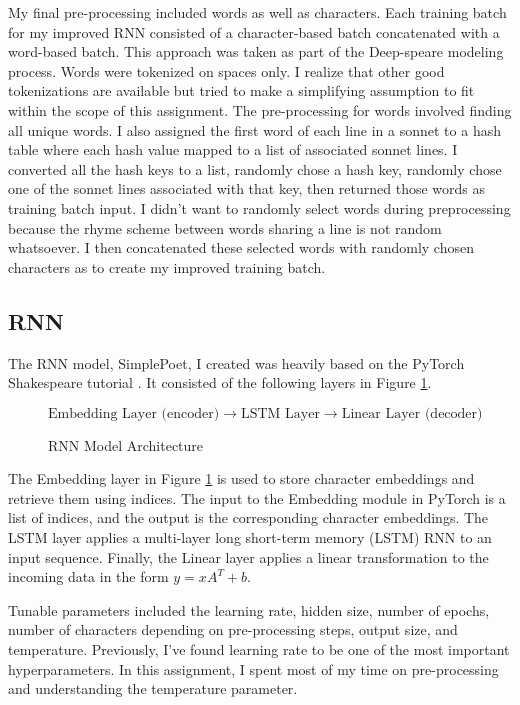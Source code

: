 \documentclass[a4paper,12pt]{article} %
\begin{document}
My final pre-processing included words as well as characters. Each training
batch for my improved RNN consisted of a character-based batch concatenated
with a word-based batch. This approach was taken as part of the Deep-speare
\cite{lau2018deepspeare} modeling process. Words were tokenized on spaces
only. I realize that other good tokenizations are available but tried to make
a simplifying assumption to fit within the scope of this assignment. The
pre-processing for words involved finding all unique words. I also  assigned
the first word of each line in a sonnet to a hash table where each hash
value mapped to a list of associated sonnet lines. I converted all the hash
keys to a list, randomly chose a hash key, randomly chose one of the sonnet
lines associated with that key, then returned those words as training batch
input. I didn't want to randomly select words during preprocessing because the
rhyme scheme between words sharing a line is not random whatsoever. I then
concatenated these selected words with randomly chosen characters as to
create my improved training batch.

\subsection{RNN}

The RNN model, SimplePoet, I created was heavily based on the PyTorch
Shakespeare tutorial \cite{practica59:online}. It consisted of the following
layers in Figure \ref{fig:rnn}. \newline

\begin{figure}
\[
\boxed{\text{Embedding Layer (encoder)}} \rightarrow
\boxed{\text{LSTM Layer}} \rightarrow
\boxed{\text{Linear Layer (decoder)}}
\]
\caption{RNN Model Architecture}
\label{fig:rnn}
\end{figure}

The Embedding layer in Figure \ref{fig:rnn} is used to store character
embeddings and retrieve them
using indices. The input to the Embedding module in PyTorch is a list of
indices, and the output is the corresponding character embeddings. The LSTM
layer applies a multi-layer long short-term memory (LSTM) RNN to an input
sequence. Finally, the Linear layer applies a linear transformation to the
incoming data in the form $y = xA^T + b$. \newline

Tunable parameters included the learning rate, hidden size, number of
epochs, number of characters depending on pre-processing steps, output
size, and temperature. Previously, I've found learning rate to be one of
the most important hyperparameters. In this assignment, I spent most of
my time on pre-processing and understanding the temperature parameter.\newline
\end{document}
